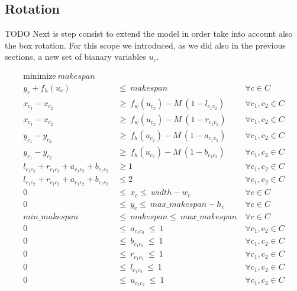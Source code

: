 \subsection{Rotation}
    \colorbox{BurntOrange}{TODO }
    Next is step consist to extend the model in order take into account also the box rotation.
    For this scope we introduced, as we did also in the previous sections, a new set of bianary 
    variables $u_c$. 

    \begin{subequations}
        \begin{align}
        \label{ilp:rot_obj} \text{minimize}\ makespan                                   &\  &\                       \\
        \label{ilp:rot_ycons}  y_c + f_h(u_c)       &\ \leq\ makespan                       &\ \forall c \in C       \\
        \label{ilp:rot_diffn1} x_{c_1} - x_{c_2} &\ \geq\ f_w(u_{c_2}) - M\ (1-l_{c_1c_2})  &\ \forall c_1, c_2 \in C\\ 
        \label{ilp:rot_diffn2} x_{c_1} - x_{c_2} &\ \geq\ f_w(u_{c_2}) - M\ (1-r_{c_1c_2})  &\ \forall c_1, c_2 \in C\\ 
        \label{ilp:rot_diffn3} y_{c_1} - y_{c_2} &\ \geq\ f_h(u_{c_2}) - M\ (1-a_{c_1c_2})  &\ \forall c_1, c_2 \in C\\ 
        \label{ilp:rot_diffn4} y_{c_1} - y_{c_2} &\ \geq\ f_h(u_{c_2}) - M\ (1-b_{c_1c_2})  &\ \forall c_1, c_2 \in C\\ 
        \label{ilp:rot_diffn5} l_{c_1c_2} + r_{c_1c_2} + a_{c_1c_2} + b_{c_1c_2}  &\ \geq 1 &\ \forall c_1, c_2 \in C\\
        \label{ilp:rot_diffn6} l_{c_1c_2} + r_{c_1c_2} + a_{c_1c_2} + b_{c_1c_2}  &\ \leq 2 &\ \forall c_1, c_2 \in C\\
        \label{ilp:rot_b_x} 0                       &\ \leq\ x_c \leq\ width - w_c          &\ \forall c \in C       \\
        \label{ilp:rot_b_y} 0                       &\ \leq\ y_c \leq\ max\_makespan-h_c    &\ \forall c \in C       \\
        \label{ilp:rot_b_makspan} min\_makespan     &\ \leq\ makespan \leq\ max\_makespan   &\ \forall c \in C       \\
        \label{ilp:rot_b_a} 0\                      &\ \leq\ a_{c_1c_2}\ \leq\ 1            &\ \forall c_1,c_2 \in C \\
        \label{ilp:rot_b_b} 0\                      &\ \leq\ b_{c_1c_2}\ \leq\ 1            &\ \forall c_1,c_2 \in C \\
        \label{ilp:rot_b_r} 0\                      &\ \leq\ r_{c_1c_2}\ \leq\ 1            &\ \forall c_1,c_2 \in C \\
        \label{ilp:rot_b_l} 0\                      &\ \leq\ l_{c_1c_2}\ \leq\ 1            &\ \forall c_1,c_2 \in C \\
        \label{ilp:rot_b_u} 0\                      &\ \leq\ u_{c_1c_2}\ \leq\ 1            &\ \forall c_1,c_2 \in C
        \end{align}    
    \end{subequations}

